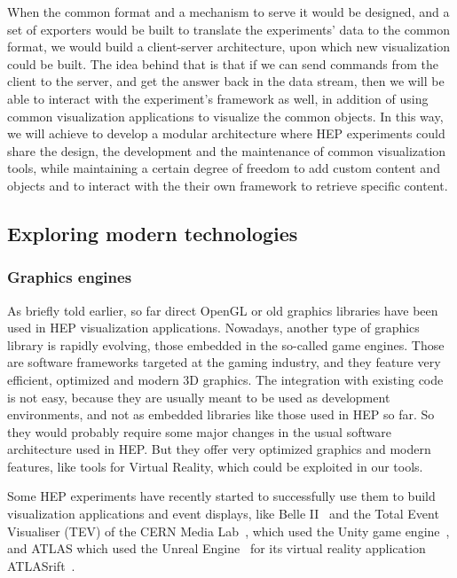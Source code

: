 \documentclass[12pt,a4paper]{article}
\begin{document}
When the common format and a mechanism to serve it would be designed, and a set of exporters would be built to translate the
experiments’ data to the common format, we would build a client-server architecture, upon which new visualization could be built.
The idea behind that is that if we can send commands from the client to the server, and get the answer back in the data stream,
then we will be able to interact with the experiment’s framework as well, in addition of using common visualization applications
to visualize the common objects. In this way, we will achieve to develop a modular architecture where HEP experiments could share
the design, the development and the maintenance of common visualization tools, while maintaining a certain degree of freedom to
add custom content and objects and to interact with the their own framework to retrieve specific content.

\hypertarget{modern-tech}{%
\subsection{Exploring modern technologies}\label{modern-tech}}

\hypertarget{graphic-engines}{%
\subsubsection{Graphics engines}\label{graphic-engines}}

As briefly told earlier, so far direct OpenGL or old graphics libraries have been used in HEP visualization applications. Nowadays,
another type of graphics library is rapidly evolving, those embedded in the so-called game engines. Those are software frameworks
targeted at the gaming industry, and they feature very efficient, optimized and modern 3D graphics.
The integration with existing code is not easy, because they are usually meant to be used as development environments, and not as
embedded libraries like those used in HEP so far. So they would probably require some major changes in the usual software architecture
used in HEP. But they offer very optimized graphics and modern features, like tools for Virtual Reality, which could be exploited in our tools.

Some HEP experiments have recently started to successfully use them to build visualization applications and event displays,
like Belle II~\cite{BelleIIVR} and the Total Event Visualiser (TEV) of the CERN Media Lab~\cite{CERNTEV}, which used the Unity
game engine~\cite{Unity3D}, and ATLAS which used the Unreal Engine~\cite{EpicUnreal} for its virtual reality application
ATLASrift~\cite{ATLASRift}.
\end{document}
